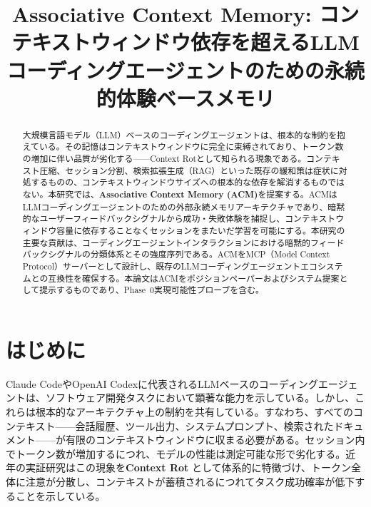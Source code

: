 \documentclass[conference]{IEEEtran}
\begin{document}
\title{Associative Context Memory: コンテキストウィンドウ依存を超えるLLMコーディングエージェントのための永続的体験ベースメモリ}

\author{
}

\maketitle

\begin{abstract}
大規模言語モデル（LLM）ベースのコーディングエージェントは、根本的な制約を抱えている。その記憶はコンテキストウィンドウに完全に束縛されており、トークン数の増加に伴い品質が劣化する——Context Rotとして知られる現象である。コンテキスト圧縮、セッション分割、検索拡張生成（RAG）といった既存の緩和策は症状に対処するものの、コンテキストウィンドウサイズへの根本的な依存を解消するものではない。本研究では、\textbf{Associative Context Memory (ACM)}を提案する。ACMはLLMコーディングエージェントのための外部永続メモリアーキテクチャであり、暗黙的なユーザーフィードバックシグナルから成功・失敗体験を捕捉し、コンテキストウィンドウ容量に依存することなくセッションをまたいだ学習を可能にする。本研究の主要な貢献は、コーディングエージェントインタラクションにおける暗黙的フィードバックシグナルの分類体系とその強度序列である。ACMをMCP（Model Context Protocol）サーバーとして設計し、既存のLLMコーディングエージェントエコシステムとの互換性を確保する。本論文はACMをポジションペーパーおよびシステム提案として提示するものであり、Phase~0実現可能性プローブを含む。
\end{abstract}

\section{はじめに}

Claude CodeやOpenAI Codexに代表されるLLMベースのコーディングエージェントは、ソフトウェア開発タスクにおいて顕著な能力を示している。しかし、これらは根本的なアーキテクチャ上の制約を共有している。すなわち、すべてのコンテキスト——会話履歴、ツール出力、システムプロンプト、検索されたドキュメント——が有限のコンテキストウィンドウに収まる必要がある。セッション内でトークン数が増加するにつれ、モデルの性能は測定可能な形で劣化する。近年の実証研究はこの現象を\textbf{Context Rot} \cite{ChromaResearch2025}として体系的に特徴づけ、トークン全体に注意が分散し、コンテキストが蓄積されるにつれてタスク成功確率が低下することを示している。
\end{document}
